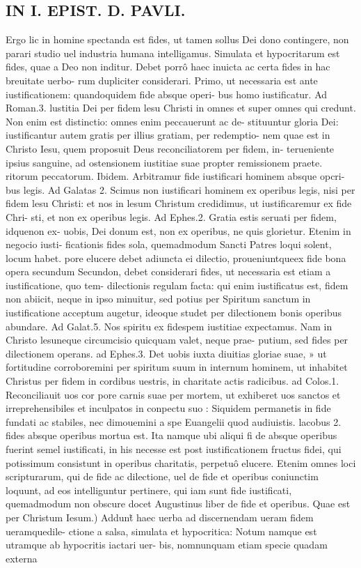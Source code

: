 \documentclass{article}
\begin{document}
\begin{pages}
\section*{IN I. EPIST. D. PAVLI. }
\marginpar{[ p.47 ]}\pstart Ergo lic in homine spectanda est fides, ut tamen sollus Dei dono contingere, non parari studio uel industria humana intelligamus. Simulata et hypocritarum est fides, quae a Deo non inditur. Debet porrô haec inuicta ac certa fides in hac breuitate uerbo- rum dupliciter considerari.  \pend\pstart Primo, ut necessaria est ante iustificationem: quandoquidem fide absque operi- bus homo iustificatur. Ad Roman.3. lustitia Dei per fidem lesu Christi in omnes et super omnes qui credunt. Non enim est distinctio: omnes enim peccauerunt ac de- stituuntur gloria Dei: iustificantur autem gratis per illius gratiam, per redemptio-   nem quae est in Christo Iesu, quem proposuit Deus reconciliatorem per fidem, in-   terueniente ipsius sanguine, ad ostensionem iustitiae suae propter remissionem praete.   ritorum peccatorum. Ibidem. Arbitramur fide iustificari hominem absque opcri-   bus legis. Ad Galatas 2. Scimus non iustificari hominem ex operibus legis, nisi per fidem lesu Christi: et nos in lesum Christum credidimus, ut iustificaremur ex fide Chri-   sti, et non ex operibus legis. Ad Ephes.2. Gratia estis seruati per fidem, idquenon ex- uobis, Dei donum est, non ex operibus, ne quis glorietur. Etenim in negocio iusti- ficationis fides sola, quemadmodum Sancti Patres loqui solent, locum habet.  \pend\pstart pore elucere debet adiuncta ei dilectio, proueniuntqueex fide bona opera secundum  Secundon, debet considerari fides, ut necessaria est etiam a iustificatione, quo tem- dilectionis regulam facta: qui enim iustificatus est, fidem non abiicit, neque in ipso minuitur, sed potius per Spiritum sanctum in iustificatione acceptum augetur, ideoque  studet per dilectionem bonis operibus abundare. Ad Galat.5. Nos spiritu ex fidespem   iustitiae expectamus. Nam in Christo lesuneque  circumcisio quicquam valet, neque  prae-   putium, sed fides per dilectionem operans. ad Ephes.3. Det uobis iuxta diuitias gloriae suae, » ut fortitudine corroboremini per spiritum suum in internum hominem, ut inhabitet Christus   per fidem in cordibus uestris, in charitate actis radicibus. ad Colos.1. Reconciliauit uos cor   pore carnis suae per mortem, ut exhiberet uos sanctos et irreprehensibiles et inculpatos in conpectu suo : Siquidem permanetis in fide fundati ac stabiles, nec dimouemini a spe Euangelii quod audiuistis. lacobus 2. fides absque  operibus mortua est. Ita namque  ubi aliqui fi de absque  operibus fuerint semel iustificati, in his necesse est post iustificationem fructus fidei, qui potissimum consistunt in operibus charitatis, perpetuô elucere. Etenim omnes loci scripturarum, qui de fide ac dilectione, uel de fide et operibus coniunctim loquunt, ad eos intelliguntur pertinere, qui iam sunt fide iustificati, quemadmodum non obscure docet Augustinus liber  de fide et operibus.  \pend\pstart Quae est per Christum Iesum.) Addunt̃ haec uerba ad discernendam ueram fidem ueramquedile- ctione a salsa, simulata et hypocritica: Notum namque  est utramque  ab hypocritis iactari uer- bis, nomnunquam etiam specie quadam externa 
\end{pages}
\end{document}
